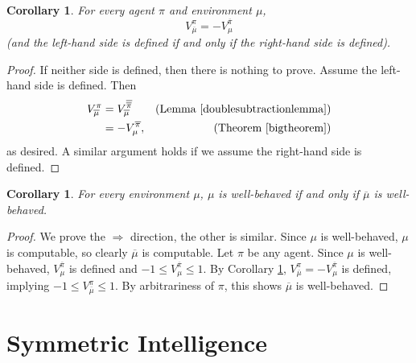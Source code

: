 \documentclass{article}
\newtheorem{corollary}[theorem]{Corollary}
\begin{document}
\begin{corollary}
\label{twistcorollary}
    For every agent $\pi$ and environment $\mu$,
    \[V^\pi_{\overline\mu}=-V^{\overline\pi}_{\mu}\]
    (and the left-hand side is defined if and only if the right-hand side is defined).
\end{corollary}

\begin{proof}
    If neither side is defined, then there is nothing to prove.
    Assume the left-hand side is defined. Then
    \begin{align*}
        V^\pi_{\overline\mu}
        &= V^{\overline{\overline\pi}}_{\overline\mu}
            &\mbox{(Lemma \ref{doublesubtractionlemma})}\\
        &= -V^{\overline\pi}_\mu, &\mbox{(Theorem \ref{bigtheorem})}
    \end{align*}
    as desired. A similar argument holds if we assume the right-hand side is defined.
\end{proof}

\begin{corollary}
\label{wisminuswcorollary}
    For every environment $\mu$, $\mu$ is well-behaved if and only if $\overline\mu$
    is well-behaved.
\end{corollary}

\begin{proof}
    We prove the $\Rightarrow$ direction, the other is similar.
    Since $\mu$ is well-behaved, $\mu$ is computable, so clearly $\overline\mu$ is computable.
    Let $\pi$ be any agent. Since $\mu$ is well-behaved, $V^{\overline\pi}_\mu$ is defined
    and $-1\leq V^{\overline\pi}_\mu\leq 1$.
    By Corollary \ref{twistcorollary},
    $V^\pi_{\overline\mu}=-V^{\overline\pi}_\mu$ is defined,
    implying $-1\leq V^\pi_{\overline\mu}\leq 1$.
    By arbitrariness of $\pi$, this shows $\overline\mu$ is well-behaved.
\end{proof}

\section{Symmetric Intelligence}
\label{mainsecn}
\end{document}
